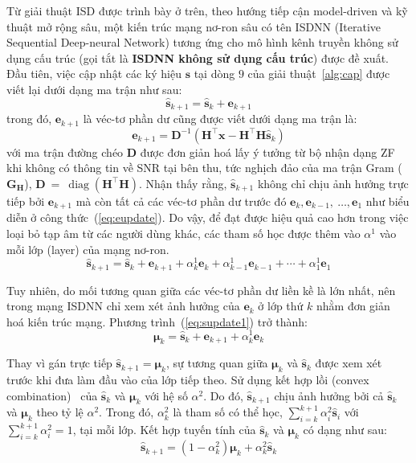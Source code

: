 Từ giải thuật ISD được trình bày ở trên, theo hướng tiếp cận model-driven và kỹ thuật mở rộng sâu, một kiến trúc mạng nơ-ron sâu có tên ISDNN (Iterative Sequential Deep-neural Network) tương ứng cho mô hình kênh truyền không sử dụng cấu trúc (gọi tắt là \textbf{ISDNN không sử dụng cấu trúc}) được đề xuất. Đầu tiên, việc cập nhật các ký hiệu $\mathbf{s}$ tại dòng $9$ của giải thuật~\ref{alg:cap} được viết lại dưới dạng ma trận như sau:
\begin{equation}
\hat{\mathbf{s}}_{k+1}=\hat{\mathbf{s}}_k+\mathbf{e}_{k+1}
\end{equation}
trong đó, $\mathbf{e}_{k+1}$ là véc-tơ phần dư cũng được viết dưới dạng ma trận là:
\begin{equation}
    \mathbf{e}_{k+1}=\mathbf{D}^{-1}\left(\mathbf{H}^\top \mathbf{x}-\mathbf{H}^\top \mathbf{H} \hat{\mathbf{s}}_k\right)
\end{equation}
với ma trận đường chéo $\mathbf{D}$ được đơn giản hoá lấy ý tưởng từ bộ nhận dạng ZF khi không có thông tin về SNR tại bên thu, tức nghịch đảo của ma trận Gram ($\mathbf{G}_\mathbf{H}$), $\mathbf{D}~=~\operatorname{diag}(\mathbf{H}^\top \mathbf{H})$. 
Nhận thấy rằng, $\hat{\mathbf{s}}_{k+1}$ không chỉ chịu ảnh hưởng trực tiếp bởi $\mathbf{e}_{k+1}$ mà còn tất cả các véc-tơ phần dư trước đó $\mathbf{e}_{k}, \mathbf{e}_{k-1},~\ldots, \mathbf{e}_{1}$ như biểu diễn ở công thức~(\ref{eq:eupdate}). Do vậy, để đạt được hiệu quả cao hơn trong việc loại bỏ tạp âm từ các người dùng khác, các tham số học được thêm vào $\alpha^1$ vào mỗi lớp (layer) của mạng nơ-ron.
\begin{equation}
\label{eq:supdate1}
\hat{\mathbf{s}}_{k+1}=\hat{\mathbf{s}}_k+\mathbf{e}_{k+1}+\alpha_k^{1} \mathbf{e}_k+\alpha_{k-1}^{1} \mathbf{e}_{k-1}+\cdots+\alpha_1^{1} \mathbf{e}_1
\end{equation}

Tuy nhiên, do mối tương quan giữa các véc-tơ phần dư liền kề là lớn nhất, nên trong mạng ISDNN chỉ xem xét ảnh hưởng của $\mathbf{e}_k$ ở lớp thứ $k$ nhằm đơn giản hoá kiến trúc mạng. Phương trình~(\ref{eq:supdate1}) trở thành:
\begin{equation}
\boldsymbol{\mu}_{k}=\hat{\mathbf{s}}_k+\mathbf{e}_{k+1}+\alpha_k^1 \mathbf{e}_k
\end{equation}

Thay vì gán trực tiếp $\hat{\mathbf{s}}_{k+1} = \boldsymbol{\mu}_k$, sự tương quan giữa $\boldsymbol{\mu}_k$ và $\hat{\mathbf{s}}_k$ được xem xét trước khi đưa làm đầu vào của lớp tiếp theo. Sử dụng kết hợp lồi (convex combination)~\cite{hammad2023} của $\hat{\mathbf{s}}_k$ và $\boldsymbol{\mu}_k$ với hệ số $\alpha^2$. Do đó, $\hat{\mathbf{s}}_{k+1}$ chịu ảnh hưởng bởi cả $\hat{\mathbf{s}}_k$ và $\boldsymbol{\mu}_k$ theo tỷ lệ $\alpha^2$. 
Trong đó, $\alpha^2_k$ là tham số có thể học, $\sum_{i=k}^{k+1} \alpha_i^{2} \hat{\mathbf{s}}_i$ với $\sum_{i=k}^{k+1} \alpha_i^{2}=1$, tại mỗi lớp. Kết hợp tuyến tính của $\hat{\mathbf{s}}_k$ và $\boldsymbol{\mu}_k$ có dạng như sau:
\begin{equation}
\hat{\mathbf{s}}_{k+1}=\left(1-\alpha_k^2\right) \boldsymbol{\mu}_k + \alpha_k^2 \hat{\mathbf{s}}_k
\end{equation}

